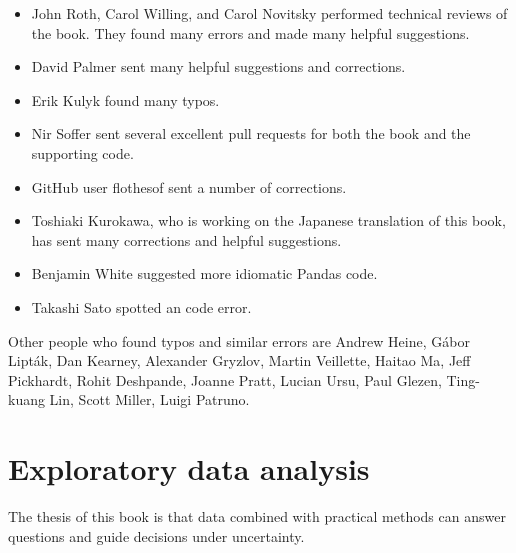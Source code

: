 \documentclass[12pt]{book}
\begin{document}
\begin{itemize}
\item John Roth, Carol Willing, and Carol Novitsky performed technical
reviews of the book.  They found many errors and made many
helpful suggestions.

\item David Palmer sent many helpful suggestions and corrections.

\item Erik Kulyk found many typos.

\item Nir Soffer sent several excellent pull requests for both the
  book and the supporting code.

\item GitHub user flothesof sent a number of corrections.

\item Toshiaki Kurokawa, who is working on the Japanese translation of
this book, has sent many corrections and helpful suggestions.

\item Benjamin White suggested more idiomatic Pandas code.

\item Takashi Sato spotted an code error.


\end{itemize}

Other people who found typos and similar errors are Andrew Heine,
G\'{a}bor Lipt\'{a}k,
Dan Kearney,
Alexander Gryzlov, 
Martin Veillette, 
Haitao Ma, 
Jeff Pickhardt,
Rohit Deshpande,
Joanne Pratt,
Lucian Ursu,
Paul Glezen,
Ting-kuang Lin,
Scott Miller,
Luigi Patruno.



\normalsize

\clearemptydoublepage

\begin{latexonly}

\tableofcontents

\clearemptydoublepage

\end{latexonly}

\mainmatter


\chapter{Exploratory data analysis}
\label{intro}

The thesis of this book is that data combined with practical
methods can answer questions and guide decisions under uncertainty.
\end{document}
